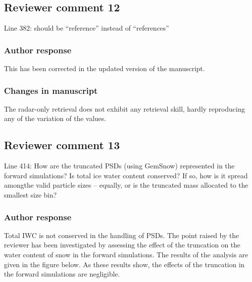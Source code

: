 
\subsection*{Reviewer comment 12}

 Line 382: should be “reference” instead of “references”

\subsubsection*{Author response}
This has been corrected in the updated version of the manuscript.

\subsubsection*{Changes in manuscript}
 \begin{change}[373]
The radar-only retrieval does not
exhibit any retrieval skill, hardly reproducing any of the variation of the
\DIFdelbegin {}\DIFdelend \DIFaddbegin {}\DIFaddend values.
 \end{change}

\subsection*{Reviewer comment 13}

Line  414:  How  are  the  truncated  PSDs  (using  GemSnow)  represented  in  the forward simulations? Is total ice water content conserved? If so, how is it spread amongthe valid particle sizes – equally, or is the truncated mass allocated to the smallest size bin?

\subsubsection*{Author response}

Total IWC is not conserved in the handling of PSDs. The point raised by the reviewer has been
investigated by assessing the effect of the truncation on the water content of snow in the
forward simulations. The results of the analysis are given in the figure below. As these results
show, the effects of the truncation in the forward simulations are negligible.

